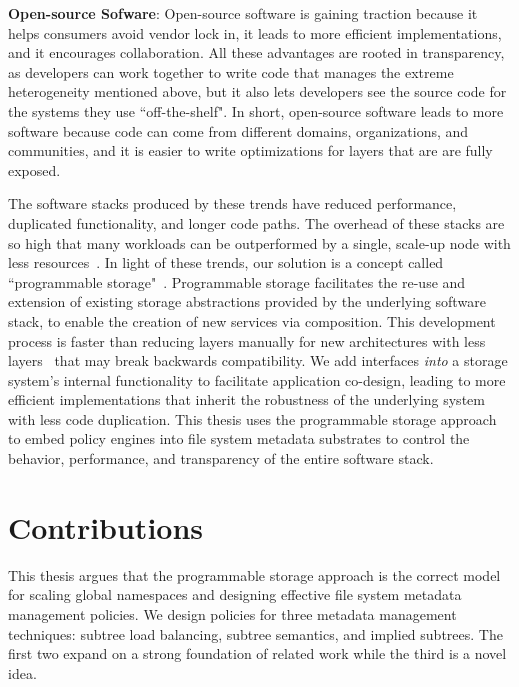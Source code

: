 \textbf{Open-source Sofware}: Open-source software is gaining traction because
it helps consumers avoid vendor lock in, it leads to more efficient
implementations, and it encourages collaboration. All these advantages are
rooted in transparency, as developers can work together to write code that
manages the extreme heterogeneity mentioned above, but it also lets developers
see the source code for the systems they use ``off-the-shelf". In short,
open-source software leads to more software because code can come from
different domains, organizations, and communities, and it is easier to write
optimizations for layers that are are fully exposed.

The software stacks produced by these trends have reduced performance,
duplicated functionality, and longer code paths.  The overhead of these stacks
are so high that many workloads can be outperformed by a single, scale-up node
with less resources~\cite{sevilla:discs2013-framework,
rowstron:hotcdp2012-hadoop-vs-single-node, schwarzkopf:hotcloud2012-7-sins,
gigaspaces:whitepaper2011-su-vs-so, michael:2007pdps-scale-up-x-scale-out}.  In
light of these trends, our solution is a concept called ``programmable
storage"~\cite{sevilla:eurosys17-malacology, watkins:hot17-declstor}.
Programmable storage facilitates the re-use and extension of existing storage
abstractions provided by the underlying software stack, to enable the creation
of new services via composition. This development process is faster than
reducing layers manually for new architectures with less
layers~\cite{bent:login16-hpc-trends} that may break backwards compatibility.
We add interfaces {\it into} a storage system's internal functionality to
facilitate application co-design, leading to more efficient implementations
that inherit the robustness of the underlying system with less code
duplication. This thesis uses the programmable storage approach to embed policy
engines into file system metadata substrates to control the behavior,
performance, and transparency of the entire software stack.

\section{Contributions}

This thesis argues that the programmable storage approach is the correct model
for scaling global namespaces and designing effective file system
metadata management policies. We design policies for three metadata management
techniques: subtree load balancing, subtree semantics, and implied subtrees.
The first two expand on a strong foundation of related work while the third is
a novel idea.

